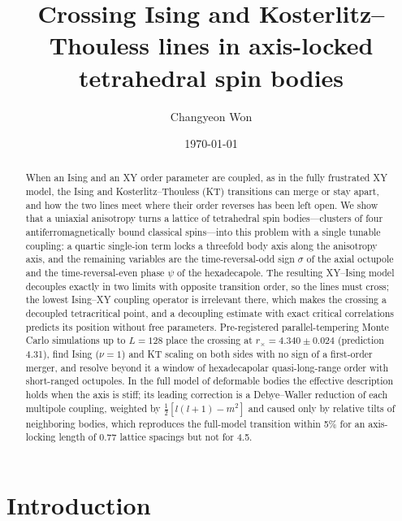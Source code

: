 \documentclass[pre,reprint,superscriptaddress,longbibliography,amsmath,amssymb,floatfix]{revtex4-2}
\begin{document}
\title{Crossing Ising and Kosterlitz--Thouless lines in axis-locked tetrahedral spin bodies}

\author{Changyeon Won}

\date{\today}

\begin{abstract}
When an Ising and an XY order parameter are coupled, as in the fully frustrated XY model, the Ising and Kosterlitz--Thouless (KT) transitions can merge or stay apart, and how the two lines meet where their order reverses has been left open. We show that a uniaxial anisotropy turns a lattice of tetrahedral spin bodies---clusters of four antiferromagnetically bound classical spins---into this problem with a single tunable coupling: a quartic single-ion term locks a threefold body axis along the anisotropy axis, and the remaining variables are the time-reversal-odd sign $\sigma$ of the axial octupole and the time-reversal-even phase $\psi$ of the hexadecapole. The resulting XY--Ising model decouples exactly in two limits with opposite transition order, so the lines must cross; the lowest Ising--XY coupling operator is irrelevant there, which makes the crossing a decoupled tetracritical point, and a decoupling estimate with exact critical correlations predicts its position without free parameters. Pre-registered parallel-tempering Monte Carlo simulations up to $L=128$ place the crossing at $r_\times=4.340\pm0.024$ (prediction 4.31), find Ising ($\nu=1$) and KT scaling on both sides with no sign of a first-order merger, and resolve beyond it a window of hexadecapolar quasi-long-range order with short-ranged octupoles. In the full model of deformable bodies the effective description holds when the axis is stiff; its leading correction is a Debye--Waller reduction of each multipole coupling, weighted by $\frac12[l(l+1)-m^2]$ and caused only by relative tilts of neighboring bodies, which reproduces the full-model transition within 5\% for an axis-locking length of 0.77 lattice spacings but not for 4.5.
\end{abstract}

\maketitle

\section{Introduction}\label{sec:intro}
\end{document}
